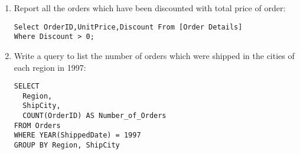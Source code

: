 \documentclass{article}
\begin{document}
\begin{enumerate}
\item Report all the orders which have been discounted with total price of order:
\begin{verbatim}
Select OrderID,UnitPrice,Discount From [Order Details]
Where Discount > 0;
\end{verbatim}

\item Write a query to list the number of orders which were shipped in the cities of each region in 1997:
\begin{verbatim}
SELECT 
  Region, 
  ShipCity, 
  COUNT(OrderID) AS Number_of_Orders
FROM Orders
WHERE YEAR(ShippedDate) = 1997
GROUP BY Region, ShipCity
\end{verbatim}
\end{enumerate}
\end{document}
